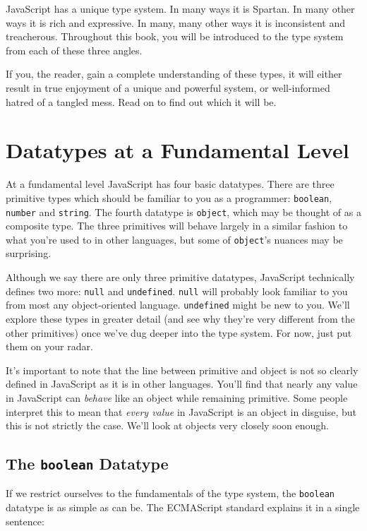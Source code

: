 \documentclass[11pt,letter]{book}
\begin{document}
    JavaScript has a unique type system. In many ways it is Spartan. In many other ways 
    it is rich and expressive. In many, many other ways it is inconsistent and treacherous.
    Throughout this book, you will be introduced to the type system from each of these three 
    angles.
    
    If you, the reader, gain a complete understanding of these types, it will either result 
    in true enjoyment of a unique and powerful system, or well-informed hatred of a tangled 
    mess. Read on to find out which it will be.
    
    \section{Datatypes at a Fundamental Level}
    At a fundamental level JavaScript has four basic datatypes. There are three primitive 
    types which should be familiar to you as a programmer: \texttt{boolean}, \texttt{number} 
    and \texttt{string}. The fourth datatype is \texttt{object}, which may be thought of as a 
    composite type. The three primitives will behave largely in a similar fashion to what you're 
    used to in other languages, but some of \texttt{object}'s nuances may be surprising.
    
    Although we say there are only three primitive datatypes, JavaScript technically defines two 
    more: \texttt{null} and \texttt{undefined}. \texttt{null} will probably look familiar to you 
    from most any object-oriented language. \texttt{undefined} might be new to you. We'll explore 
    these types in greater detail (and see why they're very different from the other primitives) 
    once we've dug deeper into the type system. For now, just put them on your radar.
    
    It's important to note that the line between primitive and object is not so clearly defined
    in JavaScript as it is in other languages. You'll find that nearly any value in JavaScript can
    \emph{behave} like an object while remaining primitive. Some people interpret this to mean that
    \emph{every value} in JavaScript is an object in disguise, but this is not strictly the case.
    We'll look at objects very closely soon enough.
    
    \subsection{The \texttt{boolean} Datatype}
    If we restrict ourselves to the fundamentals of the type system, the \texttt{boolean} 
    datatype is as simple as can be. The ECMAScript standard explains it in a single sentence:
    
\end{document}
